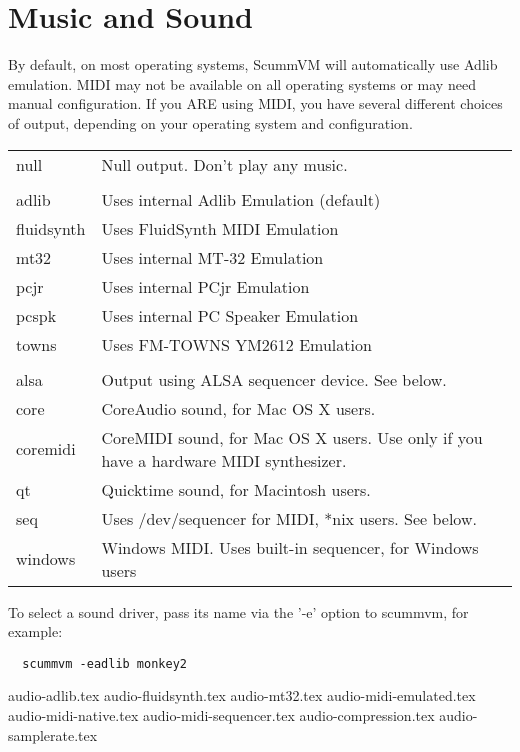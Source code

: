 \section{Music and Sound} \label{sect-music-and-sound}

By default, on most operating systems, ScummVM will automatically use Adlib
emulation. MIDI may not be available on all operating systems or may need
manual configuration. If you ARE using MIDI, you have several different
choices of output, depending on your operating system and configuration.

\begin{tabular}[h]{ll}
  null       & Null output. Don't play any music.\\
             & \\
  adlib      & Uses internal Adlib Emulation (default)\\
  fluidsynth & Uses FluidSynth MIDI Emulation\\
  mt32       & Uses internal MT-32 Emulation\\
  pcjr       & Uses internal PCjr Emulation \\
  pcspk      & Uses internal PC Speaker Emulation\\
  towns      & Uses FM-TOWNS YM2612 Emulation\\
             & \\
  alsa       & Output using ALSA sequencer device. See below.\\
  core       & CoreAudio sound, for Mac OS X users.\\
  coremidi   & CoreMIDI sound, for Mac OS X users. Use only if you have a hardware MIDI synthesizer.\\
  qt         & Quicktime sound, for Macintosh users.\\
  seq        & Uses /dev/sequencer for MIDI, *nix users. See below.\\
  windows    & Windows MIDI. Uses built-in sequencer, for Windows users\\
\end{tabular}

To select a sound driver, pass its name via the '-e' option to scummvm,
for example:
\begin{verbatim}
  scummvm -eadlib monkey2
\end{verbatim}


 {audio-adlib.tex}
 {audio-fluidsynth.tex}
 {audio-mt32.tex}
 {audio-midi-emulated.tex}
 {audio-midi-native.tex}
 {audio-midi-sequencer.tex}
 {audio-compression.tex}
 {audio-samplerate.tex}


